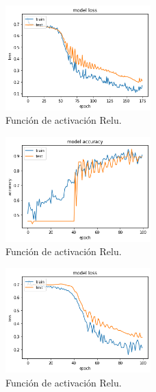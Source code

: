 \begin{figure}
    \centering
    \includegraphics[width=0.5\textwidth]{images/chapter2/batch_256_175_epoch_loss.png}
    \caption{Función de activación Relu.}
    \label{fig:Resultados de loss en el entrenamiento con un batch-size de 256 y 175 epochs, }
\end{figure}

\begin{figure}
    \centering
    \includegraphics[width=0.5\textwidth]{images/chapter2/batch_256_100_epoch.png}
    \caption{Función de activación Relu.}
    \label{fig:Resultados de la precisión de entrenamiento con un batch-size de 256 y 100 epochs}
\end{figure}

\begin{figure}
    \centering
    \includegraphics[width=0.5\textwidth]{images/chapter2/batch_256_100_epoch_loss.png}
    \caption{Función de activación Relu.}
    \label{fig:Resultados de loss en el entrenamiento con un batch-size de 256 y 100 epochs, }
\end{figure}

